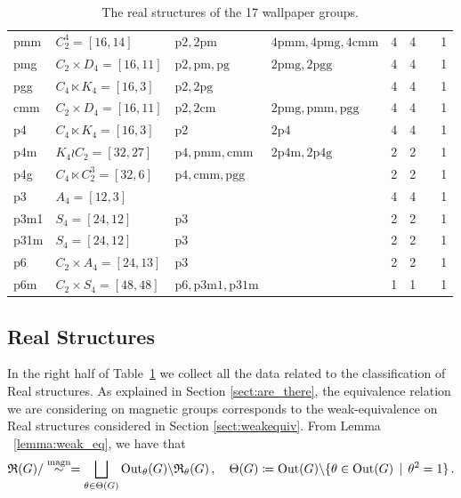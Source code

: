 \begin{table}[!htbp]
\begin{tabular}{llll|llll}
\midrule
pmm  & $C_2^4 =[16,14]$   & $\mbox{p2},2\mbox{pm}$  & $4\mbox{pmm},4\mbox{pmg},4\mbox{cmm}$      & 4  & 4  & & 1 \\
pmg  & $C_2\times D_4 =[16,11]$   & $\mbox{p2},\mbox{pm},\mbox{pg}$ & $2\mbox{pmg},2\mbox{pgg}$  & 4  & 4  & & 1  \\
pgg  & $C_4\ltimes K_4 =[16,3]$   & $\mbox{p2},2\mbox{pg}$          &                            & 4  & 4  & & 1  \\
cmm  &  $C_2\times D_4 =[16,11]$    & $\mbox{p2},2\mbox{cm}$ & $2\mbox{pmg},\mbox{pmm},\mbox{pgg}$ & 4 & 4 & & 1 \\
\midrule
p4   & $C_4\ltimes K_4 =[16,3]$      & $\mbox{p2}$  & $2 \mbox{p4}$    & 4  & 4 &  &  1  \\
p4m  & $K_4 \wr C_2 =[32,27]$     & $\mbox{p4},\mbox{pmm},\mbox{cmm}$  & $2\mbox{p4m},2\mbox{p4g}$       & 2  & 2 &  & 1  \\
p4g  & $C_4 \ltimes C_2^3 =[32,6]$    & $\mbox{p4},\mbox{cmm},\mbox{pgg}$  &       & 2  & 2 &  &  1 \\
\midrule
p3   & $A_4 = [12,3]$     &    &  &  4  & 4 &  &  1 \\
p3m1 & $S_4= [24,12]$     & $\mbox{p3}$   &  & 2 & 2 &  & 1 \\
p31m & $S_4= [24,12]$    & $\mbox{p3}$    & & 2  & 2 & &  1 \\
p6   & $C_2\times A_4 =[24,13]$     & $\mbox{p3}$       &  &  2 & 2       &  &  1  \\
p6m  & $C_2 \times S_4 = [48,48]$    & $\mbox{p6},\mbox{p3m1},\mbox{p31m}$   &  & 1 & 1  & &  1 \\
\bottomrule
\end{tabular}
\caption{The real structures of the 17 wallpaper groups.}
\label{table:wallpaper3}
\end{table}


\subsection{Real Structures}

In the right half of Table~\ref{table:wallpaper3} we collect all the data related to the classification of Real structures. As explained in Section \ref{sect:are_there}, the equivalence relation we are considering on magnetic groups corresponds to the weak-equivalence on Real structures considered in Section \ref{sect:weakequiv}. From Lemma ~\ref{lemma:weak_eq}, we have that 
\begin{equation} \label{Wallpaper:RTheta}
  {\mathfrak R}(G)/\overset{\text{magn}}{\sim}  = \bigsqcup_{\theta \in \Theta(G)} \operatorname{Out}_{\theta}(G) \backslash {\mathfrak R}_{\theta}(G) \, , \quad
  \Theta (G) \coloneqq \operatorname{Out}(G) \backslash \{ \theta \in \operatorname{Out}(G)\,\mid\, \theta^2 =1\}\, .
\end{equation}


